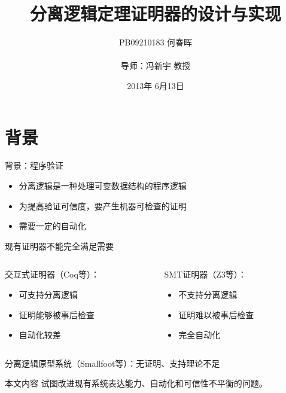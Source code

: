 \documentclass{beamer}
\title{分离逻辑定理证明器的设计与实现}
\author{PB09210183 何春晖 \\ \hfill \\ 导师：冯新宇 教授}
\date{2013年 6月13日}
\begin{document}
\frame{\titlepage}

\section{背景}
\begin{frame}[fragile]
  \begin{block}{背景：程序验证}
    \begin{itemize}
    \item 分离逻辑是一种处理可变数据结构的程序逻辑
    \item 为提高验证可信度，要产生机器可检查的证明
    \item 需要一定的自动化
    \end{itemize}
  \end{block}
  \pause
  \begin{block}{现有证明器不能完全满足需要}
    \begin{columns}
      \begin{column}{0.45\textwidth}
        交互式证明器（Coq等）：
        \begin{itemize}
        \item 可支持分离逻辑
        \item 证明能够被事后检查
        \item 自动化较差
        \end{itemize}
      \end{column}
      \begin{column}{0.45\textwidth}
        SMT证明器（Z3等）：
        \begin{itemize}
        \item 不支持分离逻辑
        \item 证明难以被事后检查
        \item 完全自动化
        \end{itemize}
      \end{column}
    \end{columns}
    分离逻辑原型系统（Smallfoot等）：无证明、支持理论不足
  \end{block}
  \pause
  \begin{block}{本文内容}
    试图改进现有系统表达能力、自动化和可信性不平衡的问题。
  \end{block}
\end{frame}
\end{document}
